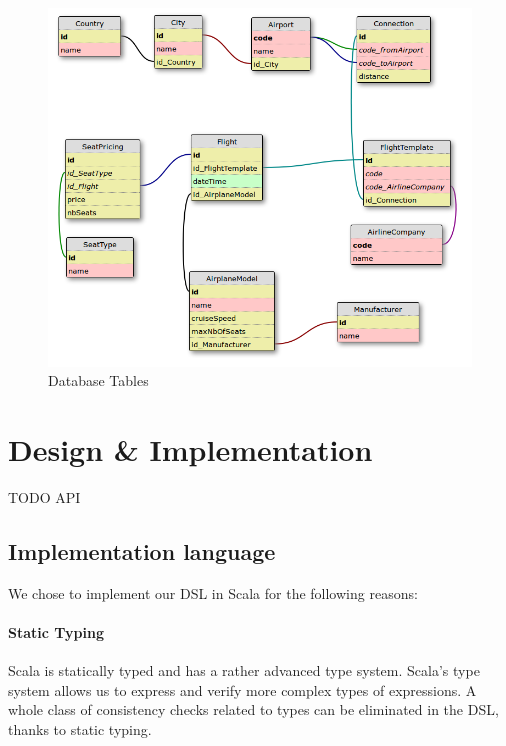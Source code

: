 \documentclass[a4paper]{article}
\begin{document}
\begin{figure}[ht!]
  \includegraphics[width=1.0\textwidth]{../analysis/dbtables-diagram.png}
  \caption{Database Tables}\label{fig:database-tables}
\end{figure}

\section{Design \& Implementation}
\label{sec:implementation-overview}



TODO API

\subsection{Implementation language}
\label{sec:implementation-language}

We chose to implement our DSL in Scala for the following reasons:

\paragraph{Static Typing}
Scala is statically typed and has a rather advanced type system.
Scala's type system allows us to express and verify more complex types of expressions.
A whole class of consistency checks related to types can be eliminated in the DSL, thanks to static typing.
\end{document}
